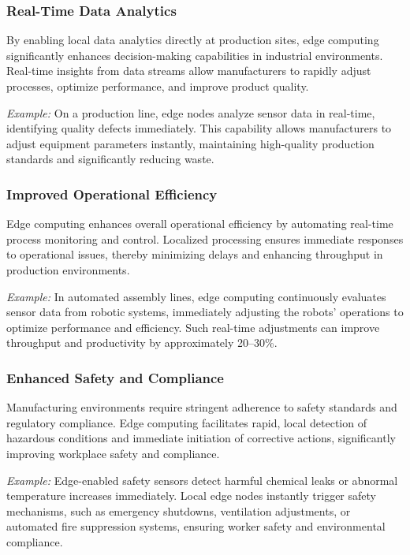 \documentclass[runningheads]{llncs}
\begin{document}
\subsubsection{Real-Time Data Analytics}
By enabling local data analytics directly at production sites, edge computing significantly enhances decision-making capabilities in industrial environments. Real-time insights from data streams allow manufacturers to rapidly adjust processes, optimize performance, and improve product quality.

\noindent\textit{Example:} On a production line, edge nodes analyze sensor data in real-time, identifying quality defects immediately. This capability allows manufacturers to adjust equipment parameters instantly, maintaining high-quality production standards and significantly reducing waste.

\subsubsection{Improved Operational Efficiency}
Edge computing enhances overall operational efficiency by automating real-time process monitoring and control. Localized processing ensures immediate responses to operational issues, thereby minimizing delays and enhancing throughput in production environments.

\noindent\textit{Example:} In automated assembly lines, edge computing continuously evaluates sensor data from robotic systems, immediately adjusting the robots' operations to optimize performance and efficiency. Such real-time adjustments can improve throughput and productivity by approximately 20–30\%.

\subsubsection{Enhanced Safety and Compliance}
Manufacturing environments require stringent adherence to safety standards and regulatory compliance. Edge computing facilitates rapid, local detection of hazardous conditions and immediate initiation of corrective actions, significantly improving workplace safety and compliance.

\noindent\textit{Example:} Edge-enabled safety sensors detect harmful chemical leaks or abnormal temperature increases immediately. Local edge nodes instantly trigger safety mechanisms, such as emergency shutdowns, ventilation adjustments, or automated fire suppression systems, ensuring worker safety and environmental compliance.
\end{document}
